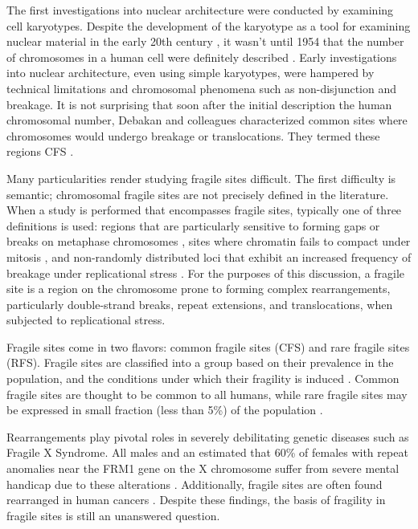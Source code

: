 The first investigations into nuclear architecture were conducted by examining cell karyotypes.  Despite the development of the karyotype as a
tool for examining nuclear material in the early 20th century \citep{levitsky1924}, it wasn't until 1954 that the number of chromosomes in a human
cell were definitely described \citep{tjio1956}.  Early investigations into nuclear architecture, even using simple karyotypes, were
hampered by technical limitations and chromosomal phenomena such as \gls{non-disjunction} and breakage.  It is not surprising that soon after the
initial description the human chromosomal number, Debakan and colleagues characterized common sites where chromosomes would undergo breakage or
translocations.  They termed these regions \gls{CFS} \citep{leyden2008}.

Many particularities render studying fragile sites difficult.  The first difficulty is semantic; chromosomal fragile sites are not precisely
defined in the literature.  When a study is performed that encompasses fragile sites, typically one of three definitions is used: regions
that are particularly sensitive to forming gaps or breaks on metaphase chromosomes \citep{glover2005}, sites where chromatin fails to compact
under mitosis \citep{leyden2008}, and non-randomly distributed loci that exhibit an increased frequency of breakage under replicational
stress \citep{franchitto2013}.  For the purposes of this discussion, a \gls{fragile site} is a region on the chromosome prone to
forming complex rearrangements, particularly double-strand breaks, repeat extensions, and translocations, when subjected to replicational stress.

Fragile sites come in two flavors: common fragile sites (CFS) and rare fragile sites (RFS).  Fragile sites are classified into a group based on their
prevalence in the population, and the conditions under which their fragility is induced \citep{leyden2008}.  Common fragile sites are thought to be common
to all humans, while rare fragile sites may be expressed in small fraction (less than 5\%) of the population \citep{wells2006}.

Rearrangements play pivotal roles in severely debilitating genetic diseases such as Fragile X Syndrome.  All males and an estimated that 60\% of females
with repeat anomalies near the FRM1 gene on the X chromosome suffer from severe mental handicap due to these alterations \citep{sutherland1995}. Additionally,
fragile sites are often found rearranged in human cancers \citep{glover2005}.  Despite these findings, the basis of fragility in fragile sites is still an
unanswered question.

